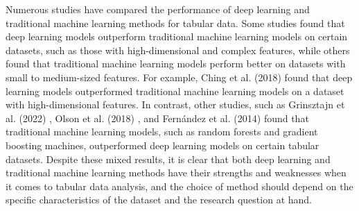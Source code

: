 Numerous studies have compared the performance of deep learning and traditional machine learning methods for tabular data. Some studies found that deep learning models outperform traditional machine learning models on certain datasets, such as those with high-dimensional and complex features, while others found that traditional machine learning models perform better on datasets with small to medium-sized features. For example, Ching et al. (2018) \cite{Ching2018} found that deep learning models outperformed traditional machine learning models on a dataset with high-dimensional features.
In contrast, other studies, such as Grinsztajn et al. (2022) \cite{Grinsztajn}, Olson et al. (2018) \cite{Olson2018}, and Fernández et al. (2014) \cite{Fernández} found that traditional machine learning models, such as random forests and gradient boosting machines, outperformed deep learning models on certain tabular datasets. Despite these mixed results, it is clear that both deep learning and traditional machine learning methods have their strengths and weaknesses when it comes to tabular data analysis, and the choice of method should depend on the specific characteristics of the dataset and the research question at hand.


